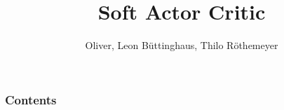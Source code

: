 \documentclass[11pt]{beamer}
\author{Oliver, Leon Büttinghaus, Thilo Röthemeyer}
\title{Soft Actor Critic}
\begin{document}
\begin{frame}
\titlepage
\end{frame}


\begin{frame}
    \frametitle{Contents}
    \tiny{\tableofcontents[currentsection]}
\end{frame}




\end{document}
